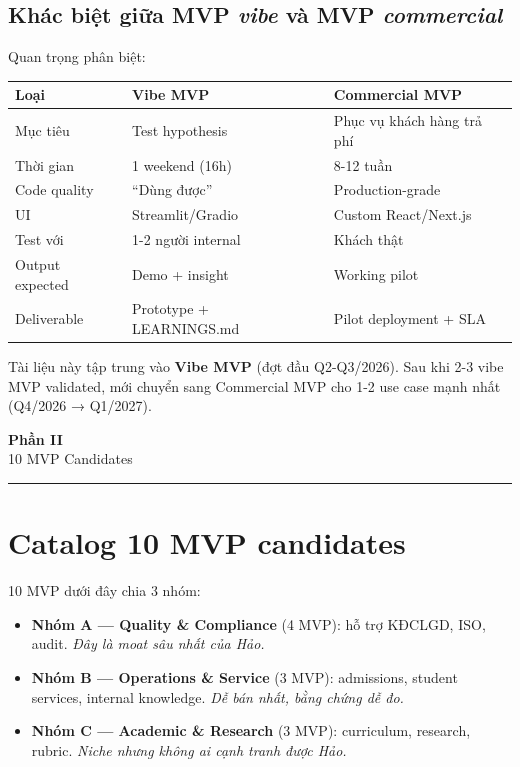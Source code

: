 \documentclass[11pt,a4paper]{article}
\begin{document}
\subsection{Khác biệt giữa MVP \textit{vibe} và MVP \textit{commercial}}

Quan trọng phân biệt:

\begin{tabularx}{\linewidth}{@{}p{3cm} X X@{}}
\toprule
\textbf{Loại} & \textbf{Vibe MVP} & \textbf{Commercial MVP} \\
\midrule
Mục tiêu & Test hypothesis & Phục vụ khách hàng trả phí \\
Thời gian & 1 weekend (16h) & 8-12 tuần \\
Code quality & ``Dùng được'' & Production-grade \\
UI & Streamlit/Gradio & Custom React/Next.js \\
Test với & 1-2 người internal & Khách thật \\
Output expected & Demo + insight & Working pilot \\
Deliverable & Prototype + LEARNINGS.md & Pilot deployment + SLA \\
\bottomrule
\end{tabularx}

Tài liệu này tập trung vào \textbf{Vibe MVP} (đợt đầu Q2-Q3/2026). Sau khi 2-3
vibe MVP validated, mới chuyển sang Commercial MVP cho 1-2 use case mạnh nhất
(Q4/2026 → Q1/2027).

\clearpage

\begin{center}
\vspace*{0.5em}
{\sffamily\bfseries\Huge\color{mvpcolor} Phần II}\\[0.5em]
{\sffamily\LARGE\color{mid} 10 MVP Candidates}\\[0.5em]
{\color{mvpcolor}\rule{6cm}{0.4pt}}
\end{center}
\vspace{1em}

\section{Catalog 10 MVP candidates}

10 MVP dưới đây chia 3 nhóm:

\begin{itemize}
\item \textbf{Nhóm A — Quality \& Compliance} (4 MVP): hỗ trợ KĐCLGD, ISO, audit. \textit{Đây là moat sâu nhất của Hảo.}
\item \textbf{Nhóm B — Operations \& Service} (3 MVP): admissions, student services, internal knowledge. \textit{Dễ bán nhất, bằng chứng dễ đo.}
\item \textbf{Nhóm C — Academic \& Research} (3 MVP): curriculum, research, rubric. \textit{Niche nhưng không ai cạnh tranh được Hảo.}
\end{itemize}
\end{document}
